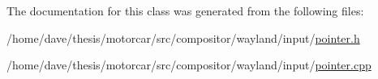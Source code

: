 The documentation for this class was generated from the following files\-:\begin{DoxyCompactItemize}
\item 
/home/dave/thesis/motorcar/src/compositor/wayland/input/\hyperlink{pointer_8h}{pointer.\-h}\item 
/home/dave/thesis/motorcar/src/compositor/wayland/input/\hyperlink{pointer_8cpp}{pointer.\-cpp}\end{DoxyCompactItemize}
